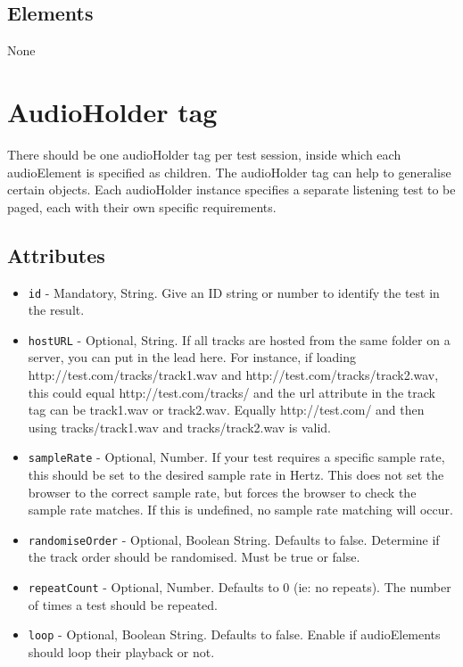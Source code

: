 \documentclass{article}
\begin{document}
\subsection{Elements}
None

\section{AudioHolder tag}

There should be one audioHolder tag per test session, inside which each audioElement is specified as children. The audioHolder tag can help to generalise certain objects. Each audioHolder instance specifies a separate listening test to be paged, each with their own specific requirements.

\subsection{Attributes}
\begin{itemize}
\item \texttt{id} - Mandatory, String. Give an ID string or number to identify the test in the result.
\item \texttt{hostURL} - Optional, String. If all tracks are hosted from the same folder on a server, you can put in the lead here. For instance, if loading http://test.com/tracks/track1.wav and http://test.com/tracks/track2.wav, this could equal http://test.com/tracks/ and the url attribute in the track tag can be track1.wav or track2.wav. Equally http://test.com/ and then using tracks/track1.wav and tracks/track2.wav is valid.
\item \texttt{sampleRate} - Optional, Number. If your test requires a specific sample rate, this should be set to the desired sample rate in Hertz. This does not set the browser to the correct sample rate, but forces the browser to check the sample rate matches. If this is undefined, no sample rate matching will occur.
\item \texttt{randomiseOrder} - Optional, Boolean String. Defaults to false. Determine if the track order should be randomised. Must be true or false.
\item \texttt{repeatCount} - Optional, Number. Defaults to 0 (ie: no repeats). The number of times a test should be repeated.
\item \texttt{loop} - Optional, Boolean String. Defaults to false. Enable if audioElements should loop their playback or not.
\end{itemize}
\end{document}
